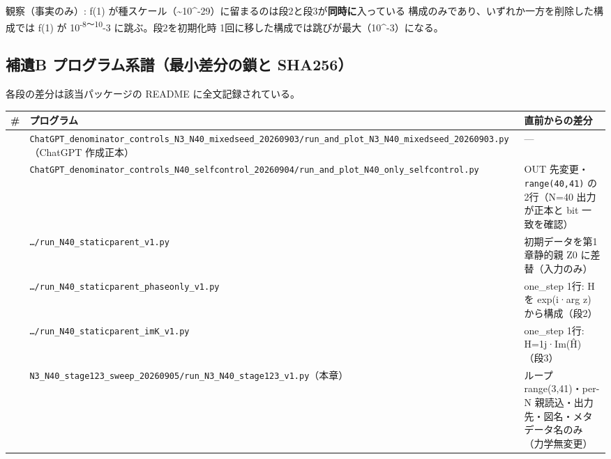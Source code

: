 \documentclass[
  a4paper,
]{ltjsarticle}
\newcounter{none} %
\begin{document}
観察（事実のみ）: f(1)
が種スケール（\textasciitilde10\^{}-29）に留まるのは段2と段3が\textbf{同時に}入っている
構成のみであり、いずれか一方を削除した構成では f(1) が
10\textsuperscript{-8〜10}-3 に跳ぶ。段2を初期化時
1回に移した構成では跳びが最大（10\^{}-3）になる。

\subsection{補遺B プログラム系譜（最小差分の鎖と
SHA256）}\label{ux88dcux907ab-ux30d7ux30edux30b0ux30e9ux30e0ux7cfbux8b5cux6700ux5c0fux5deeux5206ux306eux9396ux3068-sha256}

各段の差分は該当パッケージの README に全文記録されている。

{\def\LTcaptype{none} %
\begin{longtable}[]{@{}
  >{\raggedright\arraybackslash}p{}
  >{\raggedright\arraybackslash}p{}
  >{\raggedright\arraybackslash}p{}@{}}
\toprule\noalign{}
\begin{minipage}[b]{\linewidth}\raggedright
\#
\end{minipage} & \begin{minipage}[b]{\linewidth}\raggedright
プログラム
\end{minipage} & \begin{minipage}[b]{\linewidth}\raggedright
直前からの差分
\end{minipage} \\
\midrule\noalign{}
\endhead
\bottomrule\noalign{}
\endlastfoot
0 &
\texttt{ChatGPT\_denominator\_controls\_N3\_N40\_mixedseed\_20260903/run\_and\_plot\_N3\_N40\_mixedseed\_20260903.py}（ChatGPT
作成正本） & --- \\
1 &
\texttt{ChatGPT\_denominator\_controls\_N40\_selfcontrol\_20260904/run\_and\_plot\_N40\_only\_selfcontrol.py}
& OUT 先変更・\texttt{range(40,41)} の2行（N=40 出力が正本と bit
一致を確認） \\
2 & \texttt{…/run\_N40\_staticparent\_v1.py} & 初期データを第1章静的親
Z0 に差替（入力のみ） \\
3 & \texttt{…/run\_N40\_staticparent\_phaseonly\_v1.py} & one\_step 1行:
H を exp(i·arg z) から構成（段2） \\
4 & \texttt{…/run\_N40\_staticparent\_imK\_v1.py} & one\_step 1行:
H=1j·Im(Ĥ)（段3） \\
5 &
\texttt{N3\_N40\_stage123\_sweep\_20260905/run\_N3\_N40\_stage123\_v1.py}（本章）
& ループ range(3,41)・per-N
親読込・出力先・図名・メタデータ名のみ（力学無変更） \\
\end{longtable}
}
\end{document}
